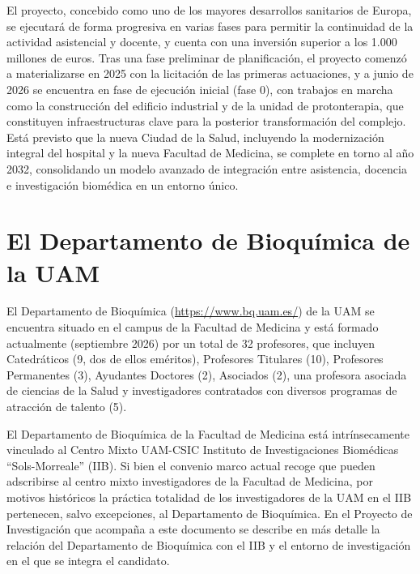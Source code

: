 \documentclass[
  11pt,
  a4paper,
  twoside]{scrreprt}
\begin{document}
El proyecto, concebido como uno de los mayores desarrollos sanitarios de
Europa, se ejecutará de forma progresiva en varias fases para permitir
la continuidad de la actividad asistencial y docente, y cuenta con una
inversión superior a los 1.000 millones de euros. Tras una fase
preliminar de planificación, el proyecto comenzó a materializarse en
2025 con la licitación de las primeras actuaciones, y a junio de 2026 se
encuentra en fase de ejecución inicial (fase 0), con trabajos en marcha
como la construcción del edificio industrial y de la unidad de
protonterapia, que constituyen infraestructuras clave para la posterior
transformación del complejo. Está previsto que la nueva Ciudad de la
Salud, incluyendo la modernización integral del hospital y la nueva
Facultad de Medicina, se complete en torno al año 2032, consolidando un
modelo avanzado de integración entre asistencia, docencia e
investigación biomédica en un entorno único.

\section{El Departamento de Bioquímica de la UAM}\label{sec-bq}

El Departamento de Bioquímica (\url{https://www.bq.uam.es/}) de la UAM
se encuentra situado en el campus de la Facultad de Medicina y está
formado actualmente (septiembre 2026) por un total de 32 profesores, que
incluyen Catedráticos (9, dos de ellos eméritos), Profesores Titulares
(10), Profesores Permanentes (3), Ayudantes Doctores (2), Asociados (2),
una profesora asociada de ciencias de la Salud y investigadores
contratados con diversos programas de atracción de talento (5).

El Departamento de Bioquímica de la Facultad de Medicina está
intrínsecamente vinculado al Centro Mixto UAM-CSIC Instituto de
Investigaciones Biomédicas ``Sols-Morreale'' (IIB). Si bien el convenio
marco actual recoge que pueden adscribirse al centro mixto
investigadores de la Facultad de Medicina, por motivos históricos la
práctica totalidad de los investigadores de la UAM en el IIB pertenecen,
salvo excepciones, al Departamento de Bioquímica. En el Proyecto de
Investigación que acompaña a este documento se describe en más detalle
la relación del Departamento de Bioquímica con el IIB y el entorno de
investigación en el que se integra el candidato.
\end{document}
